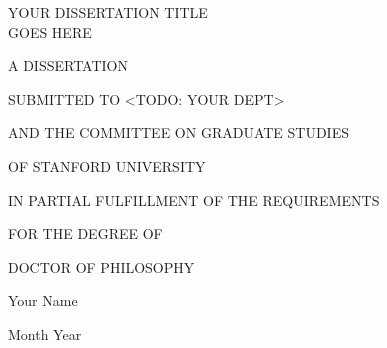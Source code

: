 \thispagestyle{empty}
\begin{titlepage}
\begin{center}

\vspace*{\fill}

{\large
YOUR DISSERTATION TITLE \\
GOES HERE
}

\vspace{2cm}

A DISSERTATION

\vspace{0.3cm}

SUBMITTED TO <TODO: YOUR DEPT>

\vspace{0.3cm}

AND THE COMMITTEE ON GRADUATE STUDIES

\vspace{0.3cm}

OF STANFORD UNIVERSITY

\vspace{0.3cm}

IN PARTIAL FULFILLMENT OF THE REQUIREMENTS

\vspace{0.3cm}

FOR THE DEGREE OF

\vspace{0.3cm}

DOCTOR OF PHILOSOPHY

\vspace{2cm}

Your Name

\vspace{0.3cm}

Month Year

\vspace*{\fill}

\end{center}
\end{titlepage}
